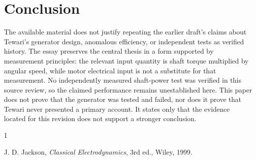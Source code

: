 \documentclass[11pt]{article}
\begin{document}
\section{Conclusion}

The available material does not justify repeating the earlier draft's claims about Tewari's generator design, anomalous efficiency, or independent tests as verified history. The essay preserves the central thesis in a form supported by measurement principles: the relevant input quantity is shaft torque multiplied by angular speed, while motor electrical input is not a substitute for that measurement. No independently measured shaft-power test was verified in this source review, so the claimed performance remains unestablished here. This paper does not prove that the generator was tested and failed, nor does it prove that Tewari never presented a primary account. It states only that the evidence located for this revision does not support a stronger conclusion.

\begin{thebibliography}{1}

 J. D. Jackson, \emph{Classical Electrodynamics}, 3rd ed., Wiley, 1999.

\end{thebibliography}
\end{document}
